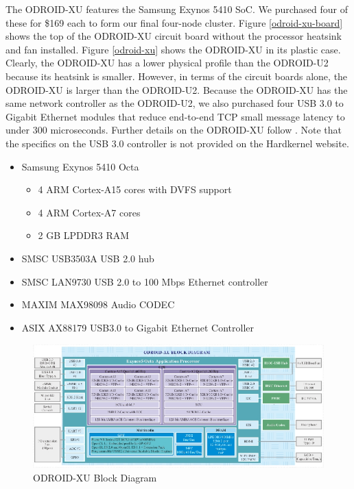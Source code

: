 \documentclass[11pt]{book}
\begin{document}
The ODROID-XU features the Samsung Exynos 5410 SoC. We purchased four of these for \$169
each to form our final four-node cluster.  Figure \ref{odroid-xu-board} shows the top of
the ODROID-XU circuit board without the processor heatsink and fan installed.  Figure
\ref{odroid-xu} shows the ODROID-XU in its plastic case.  Clearly, the ODROID-XU has a
lower physical profile than the ODROID-U2 because its heatsink is smaller.  However, in
terms of the circuit boards alone, the ODROID-XU is larger than the ODROID-U2. Because the
ODROID-XU has the same network controller as the ODROID-U2, we also purchased four USB 3.0
to Gigabit Ethernet modules that reduce end-to-end TCP small message latency to under 300
microseconds.  Further details on the ODROID-XU follow \cite{odroid-xu-board-detail}. Note
that the specifics on the USB 3.0 controller is not provided on the Hardkernel website.

\begin{itemize}
\item Samsung Exynos 5410 Octa
  \begin{itemize}
  \item 4 ARM Cortex-A15 cores with DVFS support
  \item 4 ARM Cortex-A7 cores
  \item 2 GB LPDDR3 RAM
  \end{itemize}
\item SMSC USB3503A USB 2.0 hub
\item SMSC LAN9730 USB 2.0 to 100 Mbps Ethernet controller
\item MAXIM MAX98098 Audio CODEC
\item ASIX AX88179 USB3.0 to Gigabit Ethernet Controller
\end{itemize}

\begin{figure}
\centering
\includegraphics[width=\textwidth]{odroid_xu_block_diagram}
\caption{ODROID-XU Block Diagram
  \cite{odroid-xu-board-detail}}\label{odroid-xu-block-diagram}
\end{figure}
\end{document}
